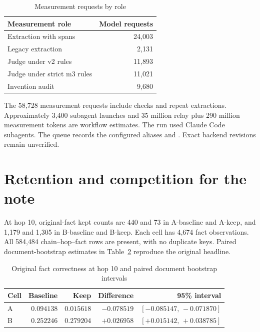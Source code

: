 \documentclass[10pt,letterpaper]{amsart}
\numberwithin{equation}{section}
\begin{document}
\begin{table}[!htbp]
  \centering
  \small
  \caption{Measurement requests by role}
  \label{tab:measurement-roles}
  \begin{tabular}{@{}lr@{}}
    \toprule
    \textbf{Measurement role} & \textbf{Model requests} \\
    \midrule
    Extraction with spans & 24,003 \\
    Legacy extraction & 2,131 \\
    Judge under v2 rules & 11,893 \\
    Judge under strict m3 rules & 11,021 \\
    Invention audit & 9,680 \\
    \bottomrule
  \end{tabular}
\end{table}

The 58,728 measurement requests include checks and repeat extractions. Approximately 3,400
subagent launches and 35 million relay plus 290 million measurement tokens are
workflow estimates. The run used Claude Code subagents. The queue records the configured
aliases  and . Exact backend revisions remain
unverified.

\section{Retention and competition for the note}
\label{sec:retention}

At hop 10, original-fact kept counts are 440 and 73 in A-baseline and A-keep, and 1,179
and 1,305 in B-baseline and B-keep. Each cell has 4,674 fact observations. All 584,484
chain--hop--fact rows are present, with no duplicate keys. Paired document-bootstrap
estimates in Table~\ref{tab:endpoints} reproduce the original headline.

\begin{table}[!htbp]
  \centering
  \small
  \caption{Original fact correctness at hop 10 and paired document bootstrap intervals}
  \label{tab:endpoints}
  \begin{tabular}{@{}lrrrr@{}}
    \toprule
    \textbf{Cell} & \textbf{Baseline} & \textbf{Keep} & \textbf{Difference} & \textbf{95\% interval} \\
    \midrule
    A & $0.094138$ & $0.015618$ & $-0.078519$ & $[-0.085147,\,-0.071870]$ \\
    B & $0.252246$ & $0.279204$ & $+0.026958$ & $[+0.015142,\,+0.038785]$ \\
    \bottomrule
  \end{tabular}
\end{table}
\end{document}
